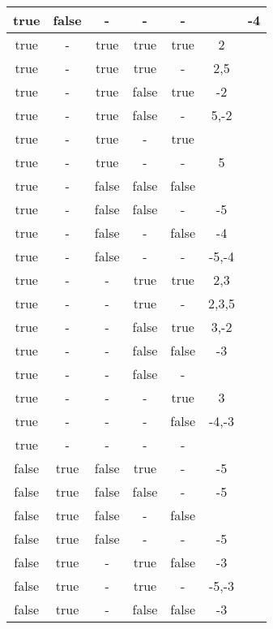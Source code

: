 \begin{longtable}{|c|c|c|c|c|c|c|}
true & false & - & - & - &                 & -4 \\ \hline 
true & - & true & true & true & 2               &    \\ \hline 
true & - & true & true & - & 2,5             &    \\ \hline 
true & - & true & false & true & -2              &    \\ \hline 
true & - & true & false & - & 5,-2            &    \\ \hline 
true & - & true & - & true &                 &    \\ \hline 
true & - & true & - & - & 5               &    \\ \hline 
true & - & false & false & false &                 &    \\ \hline 
true & - & false & false & - & -5              &    \\ \hline 
true & - & false & - & false & -4              &    \\ \hline 
true & - & false & - & - & -5,-4           &    \\ \hline 
true & - & - & true & true & 2,3             &    \\ \hline 
true & - & - & true & - & 2,3,5           &    \\ \hline 
true & - & - & false & true & 3,-2            &    \\ \hline 
true & - & - & false & false & -3              &    \\ \hline 
true & - & - & false & - &                 &    \\ \hline 
true & - & - & - & true & 3               &    \\ \hline 
true & - & - & - & false & -4,-3           &    \\ \hline 
true & - & - & - & - &                 &    \\ \hline 
false & true & false & true & - & -5              &    \\ \hline 
false & true & false & false & - & -5              &    \\ \hline 
false & true & false & - & false &                 &    \\ \hline 
false & true & false & - & - & -5              &    \\ \hline 
false & true & - & true & false & -3              &    \\ \hline 
false & true & - & true & - & -5,-3           &    \\ \hline 
false & true & - & false & false & -3              &    \\ \hline 

\end{longtable}
